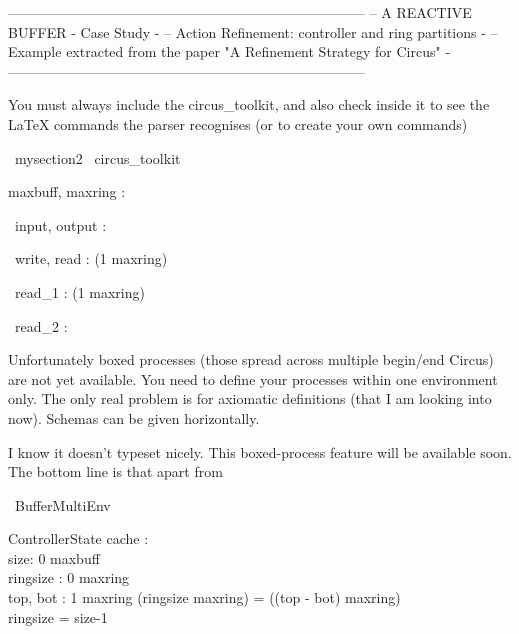 -----------------------------------------------------------------------------
-- A REACTIVE BUFFER    - Case Study                                                                                    -
-- Action Refinement: controller and ring partitions                                                -
-- Example extracted from the paper "A Refinement Strategy for Circus"          -
-----------------------------------------------------------------------------

You must always include the circus\_toolkit, and also check inside
it to see the LaTeX commands the parser recognises (or to create
your own commands)

\begin{zsection}
  \SECTION\ mysection2 \parents\ circus\_toolkit
\end{zsection}

\begin{axdef}
 maxbuff, maxring : \nat
\end{axdef}

\begin{circus}
 \circchannel\ input, output : \nat
\end{circus}

\begin{circus}
 \circchannel\ write, read : (1 \upto maxring) \cross \nat
\end{circus}

\begin{circus}
 \circchannel\ read\_1 : (1 \upto maxring)
\end{circus}

\begin{circus}
 \circchannel\ read\_2 : \nat
\end{circus}

Unfortunately boxed processes (those spread across multiple
begin/end Circus) are not yet available. You need to define your
processes within one environment only. The only real problem is for
axiomatic definitions (that I am looking into now). Schemas can be
given horizontally.

I know it doesn't typeset nicely. This boxed-process feature will be
available soon. The bottom line is that apart from

\begin{circus}
    \circprocess\ BufferMultiEnv \circdef \circbegin
\end{circus}

\begin{schema}{ControllerState}
    cache : \nat
\\%
   size: 0 \upto maxbuff
    \\%
    ringsize : 0 \upto maxring
    \\%
    top, bot : 1 \upto maxring
\where
        (ringsize \mod maxring) = ((top - bot) \mod maxring)
        \\%
        ringsize = size-1
\end{schema}

